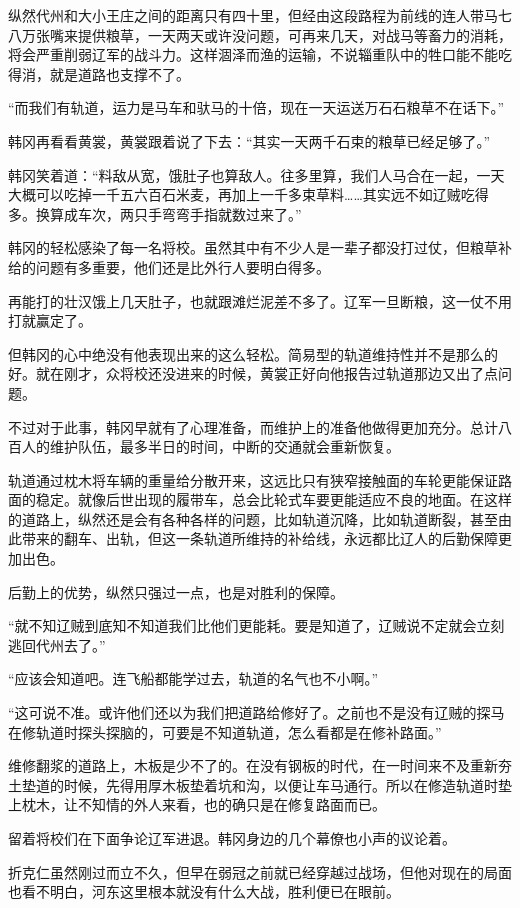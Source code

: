纵然代州和大小王庄之间的距离只有四十里，但经由这段路程为前线的连人带马七八万张嘴来提供粮草，一天两天或许没问题，可再来几天，对战马等畜力的消耗，将会严重削弱辽军的战斗力。这样涸泽而渔的运输，不说辎重队中的牲口能不能吃得消，就是道路也支撑不了。

“而我们有轨道，运力是马车和驮马的十倍，现在一天运送万石石粮草不在话下。”

韩冈再看看黄裳，黄裳跟着说了下去：“其实一天两千石束的粮草已经足够了。”

韩冈笑着道：“料敌从宽，饿肚子也算敌人。往多里算，我们人马合在一起，一天大概可以吃掉一千五六百石米麦，再加上一千多束草料……其实远不如辽贼吃得多。换算成车次，两只手弯弯手指就数过来了。”

韩冈的轻松感染了每一名将校。虽然其中有不少人是一辈子都没打过仗，但粮草补给的问题有多重要，他们还是比外行人要明白得多。

再能打的壮汉饿上几天肚子，也就跟滩烂泥差不多了。辽军一旦断粮，这一仗不用打就赢定了。

但韩冈的心中绝没有他表现出来的这么轻松。简易型的轨道维持性并不是那么的好。就在刚才，众将校还没进来的时候，黄裳正好向他报告过轨道那边又出了点问题。

不过对于此事，韩冈早就有了心理准备，而维护上的准备他做得更加充分。总计八百人的维护队伍，最多半日的时间，中断的交通就会重新恢复。

轨道通过枕木将车辆的重量给分散开来，这远比只有狭窄接触面的车轮更能保证路面的稳定。就像后世出现的履带车，总会比轮式车要更能适应不良的地面。在这样的道路上，纵然还是会有各种各样的问题，比如轨道沉降，比如轨道断裂，甚至由此带来的翻车、出轨，但这一条轨道所维持的补给线，永远都比辽人的后勤保障更加出色。

后勤上的优势，纵然只强过一点，也是对胜利的保障。

“就不知辽贼到底知不知道我们比他们更能耗。要是知道了，辽贼说不定就会立刻逃回代州去了。”

“应该会知道吧。连飞船都能学过去，轨道的名气也不小啊。”

“这可说不准。或许他们还以为我们把道路给修好了。之前也不是没有辽贼的探马在修轨道时探头探脑的，可要是不知道轨道，怎么看都是在修补路面。”

维修翻浆的道路上，木板是少不了的。在没有钢板的时代，在一时间来不及重新夯土垫道的时候，先得用厚木板垫着坑和沟，以便让车马通行。所以在修造轨道时垫上枕木，让不知情的外人来看，也的确只是在修复路面而已。

留着将校们在下面争论辽军进退。韩冈身边的几个幕僚也小声的议论着。

折克仁虽然刚过而立不久，但早在弱冠之前就已经穿越过战场，但他对现在的局面也看不明白，河东这里根本就没有什么大战，胜利便已在眼前。

